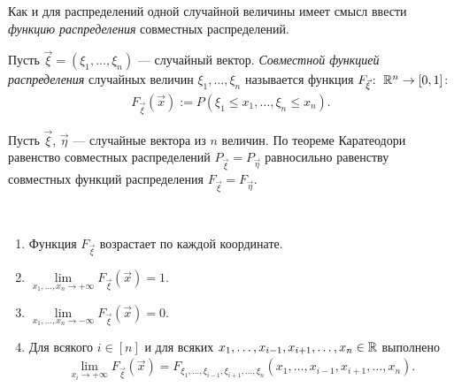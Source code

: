 \documentclass[../main.tex]{subfiles}
\begin{document}
Как и для распределений одной случайной величины имеет смысл ввести \textit{функцию распределения} совместных распределений. 

\begin{df} Пусть $ \vec\xi = (\xi_1, \ldots, \xi_n) $ --- случайный вектор. \textit{Совместной функцией распределения} случайных величин $ \xi_1, \ldots, \xi_n $ называется функция $ F_{\vec\xi} \colon\;\mathbb{R}^{n}\to[0,1] $:
 \begin{align*}
  F_{\vec\xi}(\vec x) := P(\xi_1 \leqslant x_1, \ldots, \xi_n \leqslant x_n).
 \end{align*} 
\end{df}

\begin{remrk*}
 Пусть $ \vec\xi $, $ \vec\eta $ --- случайные вектора из $ n $ величин. По теореме Каратеодори равенство совместных распределений $ P_{\vec\xi} = P_{\vec\eta} $ равносильно равенству совместных функций распределения $ F_{\vec\xi} = F_{\vec\eta} $.
\end{remrk*}

\begin{prop}\
 \begin{enumerate}
  \item Функция $ F_{\vec\xi} $ возрастает по каждой координате.
  \item $ \lim\limits_{x_1, \ldots, x_n \to +\infty}  F_{\vec\xi}(\vec x) = 1 $.
 \item $ \lim\limits_{x_1, \ldots, x_n \to -\infty} F_{\vec\xi}(\vec x) = 0 $.
 \item Для всякого $ i \in [n] $ и для всяких $ x_1, \ldots, x_{i-1}, x_{i+1}, \ldots, x_n \in \mathbb{R} $ выполнено
  \begin{align*}
  \lim_{x_i \to +\infty} F_{\vec\xi}(\vec x) = F_{\xi_1, \ldots, \xi_{i-1}, \xi_{i+1}, \ldots, \xi_n}(x_1, \ldots, x_{i-1},x_{i+1},\ldots,x_n).
\end{align*} 
 \end{enumerate}
\end{prop}
\end{document}
